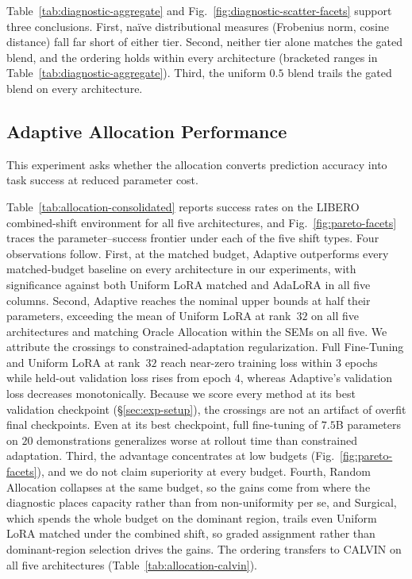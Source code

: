 


Table~\ref{tab:diagnostic-aggregate} and Fig.~\ref{fig:diagnostic-scatter-facets} support three conclusions.
First, na{\"i}ve distributional measures (Frobenius norm, cosine distance) fall far short of either tier.
Second, neither tier alone matches the gated blend, and the ordering holds within every architecture (bracketed ranges in Table~\ref{tab:diagnostic-aggregate}).
Third, the uniform $0.5$ blend trails the gated blend on every architecture.

\subsection{Adaptive Allocation Performance}
\label{sec:exp-allocation}

This experiment asks whether the allocation converts prediction accuracy into task success at reduced parameter cost.



Table~\ref{tab:allocation-consolidated} reports success rates on the LIBERO combined-shift environment for all five architectures, and Fig.~\ref{fig:pareto-facets} traces the parameter--success frontier under each of the five shift types.
Four observations follow.
First, at the matched budget, Adaptive outperforms every matched-budget baseline on every architecture in our experiments, with significance against both Uniform LoRA matched and AdaLoRA in all five columns.
Second, Adaptive reaches the nominal upper bounds at half their parameters, exceeding the mean of Uniform LoRA at rank~$32$ on all five architectures and matching Oracle Allocation within the SEMs on all five.
We attribute the crossings to constrained-adaptation regularization.
Full Fine-Tuning and Uniform LoRA at rank~$32$ reach near-zero training loss within $3$ epochs while held-out validation loss rises from epoch $4$, whereas Adaptive's validation loss decreases monotonically.
Because we score every method at its best validation checkpoint (\S\ref{sec:exp-setup}), the crossings are not an artifact of overfit final checkpoints.
Even at its best checkpoint, full fine-tuning of $7.5$B parameters on $20$ demonstrations generalizes worse at rollout time than constrained adaptation.
Third, the advantage concentrates at low budgets (Fig.~\ref{fig:pareto-facets}), and we do not claim superiority at every budget.
Fourth, Random Allocation collapses at the same budget, so the gains come from where the diagnostic places capacity rather than from non-uniformity per se, and Surgical, which spends the whole budget on the dominant region, trails even Uniform LoRA matched under the combined shift, so graded assignment rather than dominant-region selection drives the gains.
The ordering transfers to CALVIN on all five architectures (Table~\ref{tab:allocation-calvin}).

